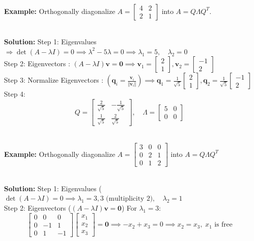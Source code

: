 \documentclass[DIV=20,oneside]{scrartcl}
\newcommand{\solution}{
	\noindent\textbf{\\Solution: }
}
\newcommand{\example}{
	\noindent\textbf{\\Example: }
}
\begin{document}
\begin{itemize}
	\example Orthogonally diagonalize $A = \begin{bmatrix} 4 & 2 \\ 2 & 1 \end{bmatrix}$ into $A = Q \Lambda Q^T$.
	\solution Step 1: Eigenvalues $\Rightarrow \det(A - \lambda I) = 0 \implies \lambda^2 - 5\lambda = 0 \implies \lambda_1 = 5, \quad \lambda_2 = 0$\\
	Step 2: Eigenvectors : $(A - \lambda I)\mathbf{v} = \mathbf{0}\implies \mathbf{v}_1 = \begin{bmatrix} 2 \\ 1 \end{bmatrix}, \mathbf{v}_2 = \begin{bmatrix} -1 \\ 2 \end{bmatrix}$\\
	Step 3: Normalize Eigenvectors : $(\mathbf{q}_i = \frac{\mathbf{v}_i}{\Vert{}\mathbf{v}_i\Vert{}}) \implies \mathbf{q}_1 = \frac{1}{\sqrt{5}}\begin{bmatrix} 2 \\ 1 \end{bmatrix}, \mathbf{q}_2 = \frac{1}{\sqrt{5}}\begin{bmatrix} -1 \\ 2 \end{bmatrix}$ 
	Step 4: $$Q = \begin{bmatrix} \frac{2}{\sqrt{5}} & -\frac{1}{\sqrt{5}} \\ \frac{1}{\sqrt{5}} & \frac{2}{\sqrt{5}} \end{bmatrix}, \quad \Lambda = \begin{bmatrix} 5 & 0 \\ 0 & 0 \end{bmatrix}$$
	\example Orthogonally diagonalize $A = \begin{bmatrix} 3 & 0 & 0 \\ 0 & 2 & 1 \\ 0 & 1 & 2 \end{bmatrix}$ into $A = Q \Lambda Q^T$
	\solution Step 1: Eigenvalues ($\det(A - \lambda I) = 0 \implies \lambda_1 = 3, 3 \text{ (multiplicity 2)}, \quad \lambda_2 = 1$\\
	Step 2: Eigenvectors ($(A - \lambda I)\mathbf{v} = \mathbf{0}$) For $\lambda_1 = 3$:$$\begin{bmatrix} 0 & 0 & 0 \\ 0 & -1 & 1 \\ 0 & 1 & -1 \end{bmatrix}\begin{bmatrix} x_1 \\ x_2 \\ x_3 \end{bmatrix} = \mathbf{0} \implies -x_2 + x_3 = 0 \implies x_2 = x_3, \; x_1 \text{ is free}$$

\end{itemize}
\end{document}
